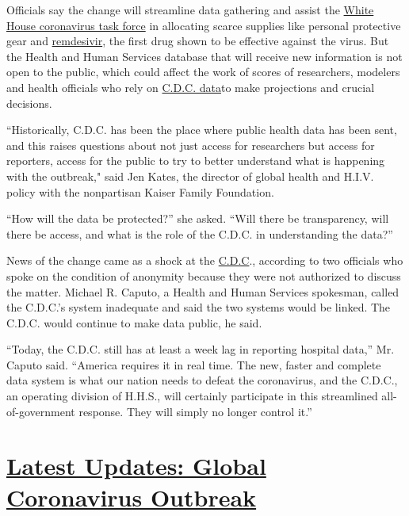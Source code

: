 Officials say the change will streamline data gathering and assist the
\href{https://www.nytimes.com/2020/07/18/us/politics/trump-coronavirus-response-failure-leadership.html}{White
House coronavirus task force} in allocating scarce supplies like
personal protective gear and
\href{https://www.nytimes.com/2020/06/29/health/coronavirus-remdesivir-gilead.html}{remdesivir},
the first drug shown to be effective against the virus. But the Health
and Human Services database that will receive new information is not
open to the public, which could affect the work of scores of
researchers, modelers and health officials who rely on
\href{https://www.cdc.gov/nhsn/covid19/report-patient-impact.html}{C.D.C.
data}to make projections and crucial decisions.

``Historically, C.D.C. has been the place where public health data has
been sent, and this raises questions about not just access for
researchers but access for reporters, access for the public to try to
better understand what is happening with the outbreak," said Jen Kates,
the director of global health and H.I.V. policy with the nonpartisan
Kaiser Family Foundation.

``How will the data be protected?'' she asked. ``Will there be
transparency, will there be access, and what is the role of the C.D.C.
in understanding the data?''

News of the change came as a shock at the
\href{https://www.nytimes.com/2020/07/24/health/cdc-schools-coronavirus.html}{C.D.C}.,
according to two officials who spoke on the condition of anonymity
because they were not authorized to discuss the matter. Michael R.
Caputo, a Health and Human Services spokesman, called the C.D.C.'s
system inadequate and said the two systems would be linked. The C.D.C.
would continue to make data public, he said.

``Today, the C.D.C. still has at least a week lag in reporting hospital
data,'' Mr. Caputo said. ``America requires it in real time. The new,
faster and complete data system is what our nation needs to defeat the
coronavirus, and the C.D.C., an operating division of H.H.S., will
certainly participate in this streamlined all-of-government response.
They will simply no longer control it.''

\hypertarget{latest-updates-global-coronavirus-outbreak}{%
\section{\texorpdfstring{\href{https://www.nytimes.com/2020/08/03/world/coronavirus-covid-19.html?action=click\&pgtype=Article\&state=default\&region=MAIN_CONTENT_1\&context=storylines_live_updates}{Latest
Updates: Global Coronavirus
Outbreak}}{Latest Updates: Global Coronavirus Outbreak}}\label{latest-updates-global-coronavirus-outbreak}}

